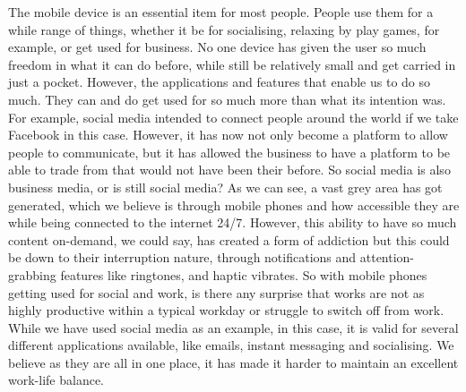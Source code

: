 \documentclass{sigchi}
\begin{document}
		The mobile device is an essential item for most people. People use them for a while range of things, whether it be for socialising, relaxing by play games, for example, or get used for business. No one device has given the user so much freedom in what it can do before, while still be relatively small and get carried in just a pocket. However, the applications and features that enable us to do so much. They can and do get used for so much more than what its intention was. For example, social media intended to connect people around the world if we take Facebook in this case. However, it has now not only become a platform to allow people to communicate, but it has allowed the business to have a platform to be able to trade from that would not have been their before. So social media is also business media, or is still social media? As we can see, a vast grey area has got generated, which we believe is through mobile phones and how accessible they are while being connected to the internet 24/7. However, this ability to have so much content on-demand, we could say, has created a form of addiction but this could be down to their interruption nature, through notifications and attention-grabbing features like ringtones, and haptic vibrates. So with mobile phones getting used for social and work, is there any surprise that works are not as highly productive within a typical workday or struggle to switch off from work. While we have used social media as an example, in this case, it is valid for several different applications available, like emails, instant messaging and socialising. We believe as they are all in one place, it has made it harder to maintain an excellent work-life balance.
		
\end{document}
